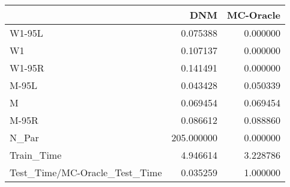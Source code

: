 \begin{tabular}{lrr}
\toprule
{} &         DNM &  MC-Oracle \\
\midrule
W1-95L                        &    0.075388 &   0.000000 \\
W1                            &    0.107137 &   0.000000 \\
W1-95R                        &    0.141491 &   0.000000 \\
M-95L                         &    0.043428 &   0.050339 \\
M                             &    0.069454 &   0.069454 \\
M-95R                         &    0.086612 &   0.088860 \\
N\_Par                         &  205.000000 &   0.000000 \\
Train\_Time                    &    4.946614 &   3.228786 \\
Test\_Time/MC-Oracle\_Test\_Time &    0.035259 &   1.000000 \\
\bottomrule
\end{tabular}
